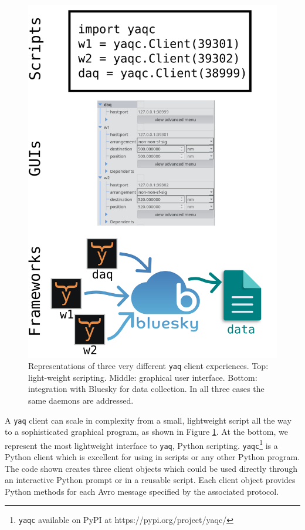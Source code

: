 \documentclass[aip, amsmath, amssymb, reprint,]{revtex4-2}
\newcommand\yaq{\texttt{yaq}}
\begin{document}
\begin{figure}
  \includegraphics[width=\columnwidth]{figures/client_spectrum}
  \caption{\label{fig:foundation} Representations of three very different \yaq{} client experiences. Top: light-weight scripting. Middle: graphical user interface. Bottom: integration with Bluesky for data collection. In all three cases the same daemons are addressed.}
\end{figure}

A \yaq{} client can scale in complexity from a small, lightweight script all the way to a sophisticated graphical program, as shown in Figure \ref{fig:foundation}.
At the bottom, we represent the most lightweight interface to \yaq{}, Python scripting.
\texttt{yaqc}\footnote{\texttt{yaqc} available on PyPI at https://pypi.org/project/yaqc/} is a Python client which is excellent for using in scripts or any other Python program.
The code shown creates three client objects which could be used directly through an interactive Python prompt or in a reusable script.
Each client object provides Python methods for each Avro message specified by the associated protocol.
\end{document}
